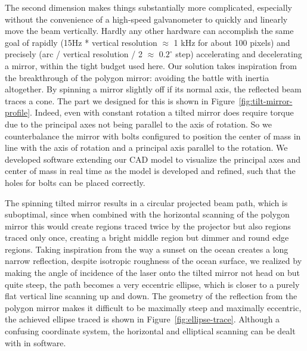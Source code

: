 \documentclass[twocolumn]{revtex4-2}
\begin{document}
The second dimension makes things substantially more complicated, especially without the convenience of a high-speed galvanometer to quickly and linearly move the beam vertically. Hardly any other hardware can accomplish the same goal of rapidly (15Hz * vertical resolution $\approx$ 1 kHz for about 100 pixels) and precisely (arc / vertical resolution / 2 $\approx$ $0.2^{\circ}$ step) accelerating and decelerating a mirror, within the tight budget used here. Our solution takes inspiration from the breakthrough of the polygon mirror: avoiding the battle with inertia altogether. By spinning a mirror slightly off if its normal axis, the reflected beam traces a cone. The part we designed for this is shown in Figure~\ref{fig:tilt-mirror-profile}. Indeed, even with constant rotation a tilted mirror does require torque due to the principal axes not being parallel to the axis of rotation. So we counterbalance the mirror with bolts configured to position the center of mass in line with the axis of rotation and a principal axis parallel to the rotation. We developed software extending our CAD model to visualize the principal axes and center of mass in real time as the model is developed and refined, such that the holes for bolts can be placed correctly.

The spinning tilted mirror results in a circular projected beam path, which is suboptimal, since when combined with the horizontal scanning of the polygon mirror this would create regions traced twice by the projector but also regions traced only once, creating a bright middle region but dimmer and round edge regions. Taking inspiration from the way a sunset on the ocean creates a long narrow reflection, despite isotropic roughness of the ocean surface, we realized by making the angle of incidence of the laser onto the tilted mirror not head on but quite steep, the path becomes a very eccentric ellipse, which is closer to a purely flat vertical line scanning up and down. The geometry of the reflection from the polygon mirror makes it difficult to be maximally steep and maximally eccentric, the achieved ellipse traced is shown in Figure~\ref{fig:ellipse-trace}. Although a confusing coordinate system, the horizontal and elliptical scanning can be dealt with in software. 
\end{document}
